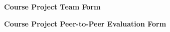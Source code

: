 \documentclass[12pt]{article}
\renewcommand{\_}{\kern-1.5pt\textunderscore\kern-1.5pt}
\begin{document}
\begin{enumerate}

	      \newpage

\end{enumerate}\par

\textbf{Course Project Team Form}\par


\vspace{\baselineskip}






\vspace{\baselineskip}




\vspace{\baselineskip}



\newpage

\vspace{\baselineskip}
\vspace{\baselineskip}
\textbf{Course Project Peer-to-Peer Evaluation Form}\par


\vspace{\baselineskip}











\end{document}
